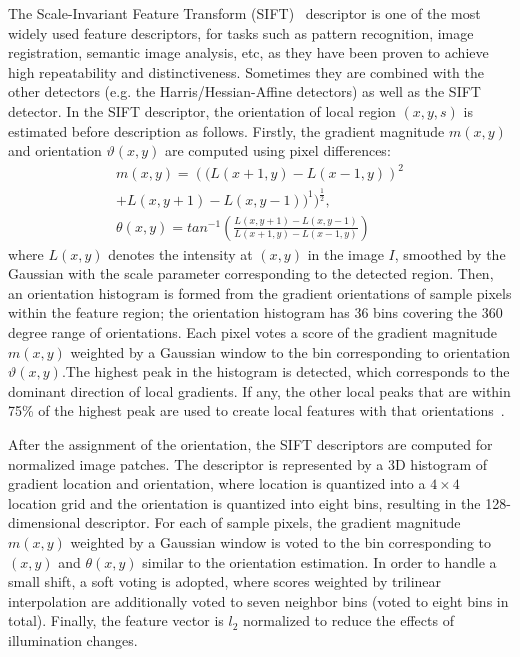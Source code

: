 The Scale-Invariant Feature Transform (SIFT)~\cite{lowe2004distinctive} descriptor is one of the most widely used
feature descriptors, for tasks such as pattern recognition, image registration, semantic
image analysis, etc, as they have been proven to achieve high
repeatability and distinctiveness. Sometimes they are combined with the other
detectors (e.g. the Harris/Hessian-Affine detectors) as well
as the SIFT detector. In the SIFT descriptor, the orientation
of local region $(x, y, s)$ is estimated before description as
follows. Firstly, the gradient magnitude $m(x, y)$ and orientation $\vartheta(x, y)$ are computed using pixel differences:
 \begin{align}
  m(x,y) = \left((L(x+1,y) - L(x-1,y)\right)^2  \\
	  + L(x, y + 1) − L(x, y − 1))^1)^\frac{1}{2} , \\
	  \theta(x,y) = tan^{-1} \left( \frac{ L(x, y + 1) − L(x, y − 1)}{L(x+1,y) - L(x-1,y)}\right)
 \end{align}
where $L(x, y)$ denotes the intensity at $(x, y)$ in the image $I$,
smoothed by the Gaussian with the scale parameter corresponding to the detected region. 
Then, an orientation histogram is formed from the gradient orientations of sample
pixels within the feature region; the orientation histogram
has 36 bins covering the 360 degree range of orientations.
Each pixel votes a score of the gradient magnitude $m(x, y)$
weighted by a Gaussian window to the bin corresponding to orientation $\vartheta(x, y)$.The highest peak in the histogram is detected, which corresponds to the dominant direction of local gradients. If any, the other local peaks that are within 75\% of the highest peak are used to create local features with that orientations~\cite{lowe2004distinctive}.

After the assignment of the orientation, the SIFT descriptors are computed for normalized image patches. 
The descriptor is represented by a 3D histogram of gradient location and orientation, where location is quantized into a $4\times 4$ location grid and the orientation is quantized into eight bins, resulting in the 128-dimensional descriptor. For each of sample pixels, the gradient magnitude $m(x, y)$ weighted
by a Gaussian window is voted to the bin corresponding to $(x, y)$ and $\theta(x, y)$ similar to the orientation estimation. In order to handle a small shift, a soft voting is adopted, where
scores weighted by trilinear interpolation are additionally
voted to seven neighbor bins (voted to eight bins in total).
Finally, the feature vector is $l_2$ normalized to reduce the effects of illumination changes.
 
